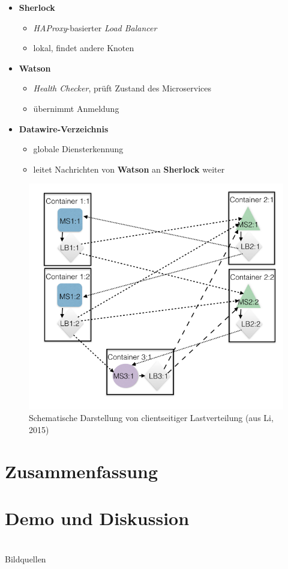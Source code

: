 \documentclass{beamer}
\begin{document}
\begin{frame}{\insertsubsection}
	\begin{itemize}[<+->]
		\setlength\itemsep{1em}
		\item \textbf{Sherlock} 
		\begin{itemize}
			\item \textit{HAProxy}-basierter \textit{Load Balancer}
			\item lokal, findet andere Knoten
		\end{itemize}
		\item \textbf{Watson} 
		\begin{itemize}
			\item \textit{Health Checker}, prüft Zustand des Microservices 
			\item übernimmt Anmeldung
		\end{itemize}
		\item \textbf{Datawire-Verzeichnis} 
		\begin{itemize}
			\item globale Diensterkennung
			\item leitet Nachrichten von \textbf{Watson} an \textbf{Sherlock} weiter
		\end{itemize}
	\end{itemize}
	\vfill
	\hfill{\footnotesize\cite{Li15}}
\end{frame}

\begin{frame}{\insertsubsection}
	\begin{figure}
		\centering
		\includegraphics[width=.65\linewidth]{img/clientloadbal}
		\caption{Schematische Darstellung von clientseitiger Lastverteilung (aus Li, 2015)}
		\label{fig:clientseitige_lastverteilung}
	\end{figure}
\end{frame}

\section{Zusammenfassung}

\section{Demo und Diskussion}

\section{\bibname}
\begin{frame}[allowframebreaks]{\bibname}
	\AtBeginSection{}
	\nocite{*}
	
	
\end{frame}
\begin{frame}[allowframebreaks]{Bildquellen}
\end{frame}
\end{document}
